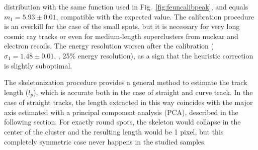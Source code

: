 distribution with the same function used in
Fig.~\ref{fig:feuncalibpeak}, and equals $m_1 = 5.93 \pm 0.01$\keV,
compatible with the expected value. The calibration procedure is an
overkill for the case of the small \fe spots, but it is necessary for
very long cosmic ray tracks or even for medium-length superclusters
from nuclear and electron recoils.  The energy resolution worsen after
the calibration ($\sigma_1 = 1.48 \pm 0.01$, \ie, 25\% energy
resolution), as a sign that the heuristic correction is slightly
suboptimal.
%
%

The skeletonization procedure provides a general method to estimate
the track length ($l_p$), which is accurate both in the case of straight
and curve track.  In the case of straight tracks, the length extracted
in this way coincides with the major axis estimated with a principal
component analysis (PCA), described in the following section. For
exactly round spots, the skeleton would collapse in the center of the
cluster and the resulting length would be 1 pixel, but this completely
symmetric case never happens in the studied samples.
